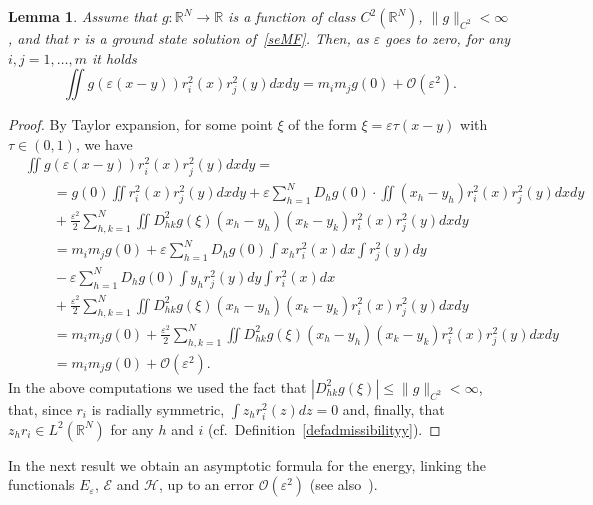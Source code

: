\documentclass[11pt]{amsart}
\numberwithin{equation}{section}
\newtheorem{lemma}[theorem]{Lemma}
\theoremstyle{definition}
\begin{document}
\begin{lemma}\label{potePhi}
Assume that $g:{{\mathbb R}}^N\to{{\mathbb R}}$ is a function of class $C^{2}({{\mathbb R}}^N)$,
$\|g\|_{C^2}<\infty$, and that $r$ is a ground state solution
of~\eqref{seMF}. Then, as ${\varepsilon}$ goes to zero, for any $i,j=1,\dots,m$ it holds
\begin{equation*}
\iint g({\varepsilon} (x-y))r^2_i(x)r_j^2(y)dxdy=m_im_j g(0)+{\mathcal O}({\varepsilon}^2).
\end{equation*}
\end{lemma}
\begin{proof}
By Taylor expansion, for some point $\xi$ of the form $\xi={\varepsilon}\tau (x-y)$ with $\tau\in (0,1)$, we have
\begin{align*}
&\iint g({\varepsilon} (x-y))r^2_i(x)r_j^2(y)dxdy=  \\
&\qquad  =g(0) \iint r^2_i(x)r_j^2(y)dxdy
+{\varepsilon}\sum_{h=1}^ND_hg(0) \cdot \iint (x_h-y_h) r^2_i(x)r_j^2(y)dxdy \\
&\qquad +\frac{{\varepsilon}^2}{2} \sum_{h,k=1}^N \iint D^2_{hk}g(\xi) (x_h-y_h)(x_k-y_k)   r^2_i(x)r_j^2(y)dxdy \\
&\qquad  = m_i m_jg(0) +{\varepsilon}\sum_{h=1}^ND_hg(0) \int x_h r^2_i(x)dx \int r_j^2(y)dy \\
&\qquad -{\varepsilon}\sum_{h=1}^ND_hg(0) \int y_h r^2_j(y)dy \int r_i^2(x)dx  \\
&\qquad +\frac{{\varepsilon}^2}{2} \sum_{h,k=1}^N \iint D^2_{hk}g(\xi) (x_h-y_h)(x_k-y_k)  r^2_i(x)r_j^2(y)dxdy \\
&\qquad =  m_i m_jg(0) +\frac{{\varepsilon}^2}{2} \sum_{h,k=1}^N \iint D^2_{hk}g(\xi)(x_h-y_h)(x_k-y_k)  r^2_i(x)r_j^2(y)dxdy \\
&\qquad =  m_i m_jg(0) +{\mathcal O}({\varepsilon}^2).
\end{align*}
In the above computations we used the fact that $|D^2_{hk}g(\xi)|\leq \|g\|_{C^2}<\infty$,
that, since $r_i$ is radially symmetric, $\int z_h r^2_i(z)dz=0$ and, finally, that
$z_h r_i\in L^2({{\mathbb R}}^N)$ for any $h$ and $i$ (cf.~Definition~\ref{defadmissibilityy}).
\end{proof}

\vskip4pt
\noindent
In the next result we obtain an asymptotic formula for the energy, linking the functionals
$E_{\varepsilon}$, ${\mathcal E}$ and ${\mathcal H}$, up to an error ${\mathcal O}({\varepsilon}^2)$ (see also~\cite{squa}).
\end{document}
